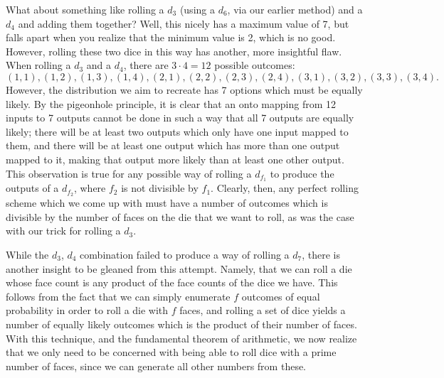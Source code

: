\documentclass{article}
\begin{document}
\par What about something like rolling a $d_3$ (using a $d_6$, via our earlier method) and a $d_4$ and adding them together?
Well, this nicely has a maximum value of 7, but falls apart when you realize that the minimum value is 2, which is no good.
However, rolling these two dice in this way has another, more insightful flaw.
When rolling a $d_3$ and a $d_4$, there are $3 \cdot 4 = 12$ possible outcomes: $$(1, 1), (1, 2), (1, 3), (1, 4), (2, 1), (2, 2), (2, 3), (2, 4), (3, 1), (3, 2), (3, 3), (3, 4).$$
However, the distribution we aim to recreate has 7 options which must be equally likely.
By the pigeonhole principle, it is clear that an onto mapping from 12 inputs to 7 outputs cannot be done in such a way that all 7 outputs are equally likely; there will be at least two outputs which only have one input mapped to them, and there will be at least one output which has more than one output mapped to it, making that output more likely than at least one other output.
This observation is true for any possible way of rolling a $d_{f_1}$ to produce the outputs of a $d_{f_2}$, where $f_2$ is not divisible by $f_1$.
Clearly, then, any perfect rolling scheme which we come up with must have a number of outcomes which is divisible by the number of faces on the die that we want to roll, as was the case with our trick for rolling a $d_3$.

\par While the $d_3$, $d_4$ combination failed to produce a way of rolling a $d_7$, there is another insight to be gleaned from this attempt.
Namely, that we can roll a die whose face count is any product of the face counts of the dice we have. 
This follows from the fact that we can simply enumerate $f$ outcomes of equal probability in order to roll a die with $f$ faces, and rolling a set of dice yields a number of equally likely outcomes which is the product of their number of faces.
With this technique, and the fundamental theorem of arithmetic, we now realize that we only need to be concerned with being able to roll dice with a prime number of faces, since we can generate all other numbers from these.
\end{document}

